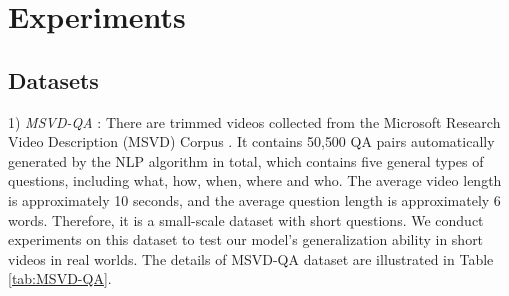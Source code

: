 \documentclass[journal]{IEEEtran}
\begin{document}
\section{Experiments} \label{sec:experiments}
\begin{table}[t]
    \centering
    \caption{Statistics of the MSVD-QA Dataset.}
    \label{tab:MSVD-QA}
\end{table}

\begin{table}[t]
    \centering
    \caption{Statistics of the MSRVTT-QA Dataset.}
    \label{tab:MSRVTT-QA}
\end{table}
\subsection{Datasets}
1) \textit{MSVD-QA} \cite{xu2017video}: There are  trimmed videos collected from the Microsoft Research Video Description (MSVD) Corpus \cite{chen2011collecting}. It contains 50,500 QA pairs automatically generated by the NLP algorithm in total, which contains five general types of questions, including what, how, when, where and who. The average video length is approximately 10 seconds, and the average question length is approximately 6 words. Therefore, it is a small-scale dataset with short questions. We conduct experiments on this dataset to test our model’s generalization ability in short videos in real worlds. The details of MSVD-QA dataset are illustrated in Table \ref{tab:MSVD-QA}.
\end{document}
